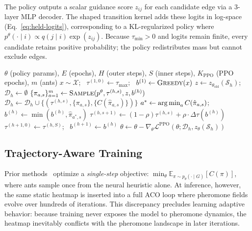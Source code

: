 The \DyNACO{} policy outputs a scalar guidance score $z_{ij}$ for each candidate edge via a 3-layer MLP decoder.
The shaped transition kernel adds these logits in log-space (Eq.~\ref{eq:held-logits}), corresponding to a KL-regularized policy where $p^\theta(\cdot\mid i) \propto q(j\mid i)\exp(z_{ij})$.
Because $\tau_{\min} > 0$ and logits remain finite, every candidate retains positive probability; the policy redistributes mass but cannot exclude edges.
\begin{algorithm}[t]
\caption{PPO training for dynamic \DyNACO{}.}
\label{alg:train}
\begin{algorithmic}[1]
\REQUIRE $\theta$ (policy params), $E$ (epochs), $H$ (outer steps), $S$ (inner steps), $K_{\text{PPO}}$ (PPO epochs), $m$ (ants)
    \STATE $x \sim \mathcal{X}$; \, $\tau^{(1,0)} \gets \tau_{\max}$; \, $b^{(1)} \gets \textsc{Greedy}(x)$
        \STATE $z \gets z_{\theta_{\text{old}}}(\mathcal{S}_h)$; \, $\mathcal{D}_h \gets \emptyset$
            \STATE $\{\pi_{a,s}\}_{a=1}^m \gets \textsc{Sample}(p^\theta, \tau^{(h,s)}, z, b^{(h)})$
            \STATE $\mathcal{D}_h \gets \mathcal{D}_h \cup \{(\tau^{(h,s)}, \{\pi_{a,s}\}, \{C(\hat{\pi}_{a,s})\})\}$
            \STATE $a^* \gets \operatorname*{arg\,min}_a C(\hat{\pi}_{a,s})$; \, $b^{(h)} \gets \min(b^{(h)}, \hat{\pi}_{a^*,s})$
            \STATE $\tau^{(h,s+1)} \gets (1{-}\rho)\tau^{(h,s)} + \rho \cdot \Delta\tau(b^{(h)})$
        \ENDFOR
        \STATE $\tau^{(h+1,0)} \gets \tau^{(h,S)}$; \, $b^{(h+1)} \gets b^{(h)}$
            \STATE $\theta \gets \theta - \nabla_\theta \mathcal{L}^{\text{PPO}}(\theta; \mathcal{D}_h, z_\theta(\mathcal{S}_h))$
        \ENDFOR
    \ENDFOR
\ENDFOR
\end{algorithmic}
\end{algorithm}



\subsection{Trajectory-Aware Training}
\label{sec:training}
Prior methods~\cite{deepaco,gfacs,gtgaco} optimize a \emph{single-step} objective: $\min_\theta \mathbb{E}_{\pi \sim p_\theta(\cdot \mid G)} [ C(\pi) ]$, where ants sample once from the neural heuristic alone.
At inference, however, the same static heatmap is inserted into a full ACO loop where pheromone fields evolve over hundreds of iterations.
This discrepancy precludes learning adaptive behavior: because training never exposes the model to pheromone dynamics, the heatmap inevitably conflicts with the pheromone landscape in later iterations.

